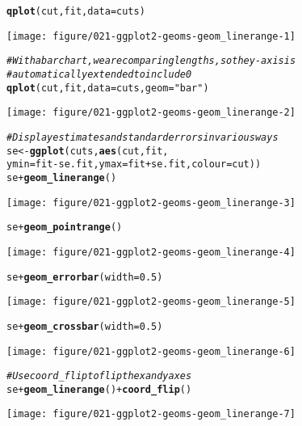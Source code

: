 \documentclass[a4paper,titlepage]{tufte-handout}\usepackage[]{graphicx}\usepackage[]{color}
\makeatletter
\def\maxwidth{ %
  \ifdim\Gin@nat@width>\linewidth
    \linewidth
  \else
    \Gin@nat@width
  \fi
}
\newcommand{\hlnum}[1]{\textcolor[rgb]{0.686,0.059,0.569}{#1}}%
\newcommand{\hlstr}[1]{\textcolor[rgb]{0.192,0.494,0.8}{#1}}%
\newcommand{\hlcom}[1]{\textcolor[rgb]{0.678,0.584,0.686}{\textit{#1}}}%
\newcommand{\hlopt}[1]{\textcolor[rgb]{0,0,0}{#1}}%
\newcommand{\hlstd}[1]{\textcolor[rgb]{0.345,0.345,0.345}{#1}}%
\newcommand{\hlkwb}[1]{\textcolor[rgb]{0.69,0.353,0.396}{#1}}%
\newcommand{\hlkwc}[1]{\textcolor[rgb]{0.333,0.667,0.333}{#1}}%
\newcommand{\hlkwd}[1]{\textcolor[rgb]{0.737,0.353,0.396}{\textbf{#1}}}%
\newenvironment{kframe}{%
 \def\at@end@of@kframe{}%
 \ifinner\ifhmode%
  \def\at@end@of@kframe{\end{minipage}}%
  \begin{minipage}{\columnwidth}%
 \fi\fi%
 \def\FrameCommand##1{\hskip\@totalleftmargin \hskip-\fboxsep
 \colorbox{shadecolor}{##1}\hskip-\fboxsep
     \hskip-\linewidth \hskip-\@totalleftmargin \hskip\columnwidth}%
 \MakeFramed {\advance\hsize-\width
   \@totalleftmargin\z@ \linewidth\hsize
   \@setminipage}}%
 {\par\unskip\endMakeFramed%
 \at@end@of@kframe}
\newenvironment{knitrout}{}{} %
\makeatother
\begin{document}
\begin{knitrout}
\begin{kframe}
\begin{alltt}
\hlkwd{qplot}\hlstd{(cut, fit,} \hlkwc{data}\hlstd{=cuts)}
\end{alltt}
\end{kframe}
\texttt{[image: figure/021-ggplot2-geoms-geom\_linerange-1]} 
\begin{kframe}\begin{alltt}
\hlcom{# With a bar chart, we are comparing lengths, so the y-axis is}
\hlcom{# automatically extended to include 0}
\hlkwd{qplot}\hlstd{(cut, fit,} \hlkwc{data}\hlstd{=cuts,} \hlkwc{geom}\hlstd{=}\hlstr{"bar"}\hlstd{)}
\end{alltt}
\end{kframe}
\texttt{[image: figure/021-ggplot2-geoms-geom\_linerange-2]} 
\begin{kframe}\begin{alltt}
\hlcom{# Display estimates and standard errors in various ways}
\hlstd{se} \hlkwb{<-} \hlkwd{ggplot}\hlstd{(cuts,} \hlkwd{aes}\hlstd{(cut, fit,}
  \hlkwc{ymin} \hlstd{= fit} \hlopt{-} \hlstd{se.fit,} \hlkwc{ymax}\hlstd{=fit} \hlopt{+} \hlstd{se.fit,} \hlkwc{colour} \hlstd{= cut))}
\hlstd{se} \hlopt{+} \hlkwd{geom_linerange}\hlstd{()}
\end{alltt}
\end{kframe}
\texttt{[image: figure/021-ggplot2-geoms-geom\_linerange-3]} 
\begin{kframe}\begin{alltt}
\hlstd{se} \hlopt{+} \hlkwd{geom_pointrange}\hlstd{()}
\end{alltt}
\end{kframe}
\texttt{[image: figure/021-ggplot2-geoms-geom\_linerange-4]} 
\begin{kframe}\begin{alltt}
\hlstd{se} \hlopt{+} \hlkwd{geom_errorbar}\hlstd{(}\hlkwc{width} \hlstd{=} \hlnum{0.5}\hlstd{)}
\end{alltt}
\end{kframe}
\texttt{[image: figure/021-ggplot2-geoms-geom\_linerange-5]} 
\begin{kframe}\begin{alltt}
\hlstd{se} \hlopt{+} \hlkwd{geom_crossbar}\hlstd{(}\hlkwc{width} \hlstd{=} \hlnum{0.5}\hlstd{)}
\end{alltt}
\end{kframe}
\texttt{[image: figure/021-ggplot2-geoms-geom\_linerange-6]} 
\begin{kframe}\begin{alltt}
\hlcom{# Use coord_flip to flip the x and y axes}
\hlstd{se} \hlopt{+} \hlkwd{geom_linerange}\hlstd{()} \hlopt{+} \hlkwd{coord_flip}\hlstd{()}
\end{alltt}
\end{kframe}
\texttt{[image: figure/021-ggplot2-geoms-geom\_linerange-7]} 

\end{knitrout}
\end{document}
